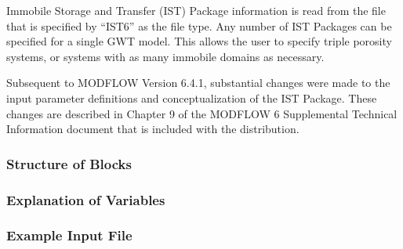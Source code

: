 Immobile Storage and Transfer (IST) Package information is read from the file that is specified by ``IST6'' as the file type.  Any number of IST Packages can be specified for a single GWT model.  This allows the user to specify triple porosity systems, or systems with as many immobile domains as necessary. 

Subsequent to MODFLOW Version 6.4.1, substantial changes were made to the input parameter definitions and conceptualization of the IST Package.  These changes are described in Chapter 9 of the MODFLOW 6 Supplemental Technical Information document that is included with the distribution.

\vspace{5mm}
\subsubsection{Structure of Blocks}



\vspace{5mm}
\subsubsection{Explanation of Variables}
\begin{description}

\end{description}

\vspace{5mm}
\subsubsection{Example Input File}



